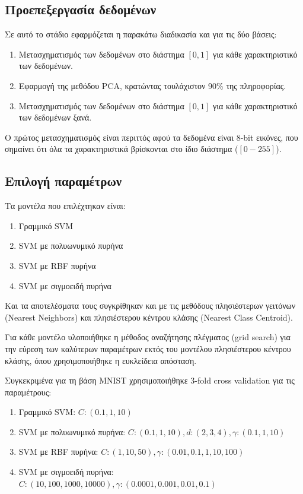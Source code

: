 \documentclass[a4paper]{article}
\begin{document}
\subsection{Προεπεξεργασία δεδομένων}

Σε αυτό το στάδιο εφαρμόζεται η παρακάτω διαδικασία και για τις δύο βάσεις:

\begin{enumerate}
    \item Μετασχηματισμός των δεδομένων στο διάστημα $[0,1]$ για κάθε
        χαρακτηριστικό των δεδομένων.
    \item Εφαρμογή της μεθόδου PCA, κρατώντας τουλάχιστον 90\% της πληροφορίας.
    \item Μετασχηματισμός των δεδομένων στο διάστημα $[0,1]$ για κάθε
        χαρακτηριστικό των δεδομένων ξανά.
\end{enumerate}

Ο πρώτος μετασχηματισμός είναι περιττός αφού τα δεδομένα είναι 8-bit εικόνες,
που σημαίνει ότι όλα τα χαρακτηριστικά βρίσκονται στο ίδιο διάστημα ($[0-255]$).

\subsection{Επιλογή παραμέτρων}

Τα μοντέλα που επιλέχτηκαν είναι:

\begin{enumerate}
    \item Γραμμικό SVM
    \item SVM με πολυωνυμικό πυρήνα
    \item SVM με RBF πυρήνα
    \item SVM με σιγμοειδή πυρήνα
\end{enumerate}

Και τα αποτελέσματα τους συγκρίθηκαν και με τις μεθόδους πλησιέστερων γειτόνων
(Nearest Neighbors) και πλησιέστερου κέντρου κλάσης (Nearest Class Centroid).

Για κάθε μοντέλο υλοποιήθηκε η μέθοδος αναζήτησης πλέγματος (grid search) για
την εύρεση των καλύτερων παραμέτρων εκτός του μοντέλου πλησιέστερου κέντρου
κλάσης, όπου χρησιμοποιήθηκε η ευκλείδεια απόσταση.

Συγκεκριμένα για τη βάση MNIST χρησιμοποιήθηκε 3-fold cross validation για τις
παραμέτρους:

\begin{enumerate}
    \item Γραμμικό SVM: $C: (0.1, 1, 10)$
    \item SVM με πολυωνυμικό πυρήνα: $C: (0.1, 1, 10), d: (2, 3, 4), \gamma:
        (0.1, 1, 10)$
    \item SVM με RBF πυρήνα: $C: (1, 10, 50), \gamma: (0.01, 0.1, 1, 10, 100)$
    \item SVM με σιγμοειδή πυρήνα: $C: (10, 100, 1000, 10000), \gamma: (0.0001,
        0.001, 0.01, 0.1)$
\end{enumerate}
\end{document}
